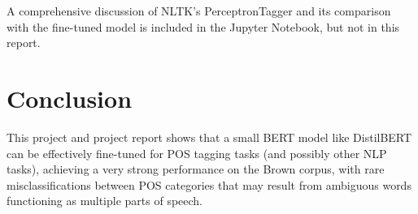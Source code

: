 \documentclass[10pt,twocolumn,letterpaper]{article}
\begin{document}
A comprehensive discussion of NLTK's PerceptronTagger \cite{nltk_perceptron} and its comparison with the fine-tuned model is included in the Jupyter Notebook, but not in this report.

\section{Conclusion}

This project and project report shows that a small BERT model like DistilBERT can be effectively fine-tuned for POS tagging tasks (and possibly other NLP tasks), achieving a very strong performance on the Brown corpus, with rare misclassifications between POS categories that may result from ambiguous words functioning as multiple parts of speech.

\newpage

\end{document}
